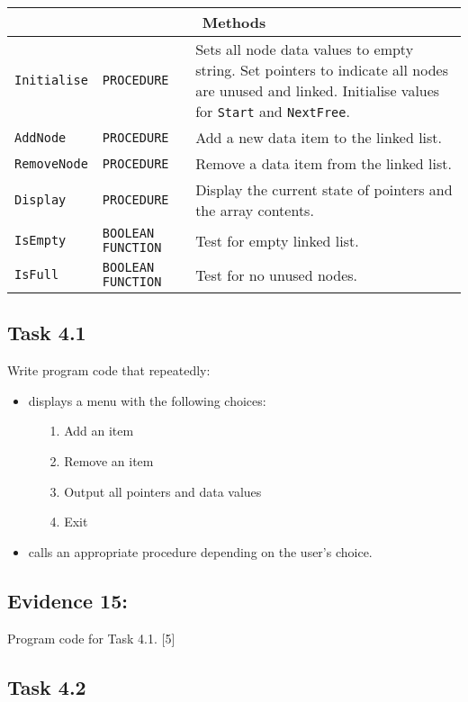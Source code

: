 \begin{center}
\begin{tabular}{|l|l|l|}
\hline 
\multicolumn{3}{|c|}{Methods}\tabularnewline
\hline 
\texttt{Initialise} & \texttt{PROCEDURE} & Sets all node data values to empty string. Set pointers to indicate
all nodes are unused and linked. Initialise values for \texttt{Start}
and \texttt{NextFree}.\tabularnewline
\hline 
\texttt{AddNode} & \texttt{PROCEDURE} & Add a new data item to the linked list. \tabularnewline
\hline 
\texttt{RemoveNode} & \texttt{PROCEDURE} & Remove a data item from the linked list.\tabularnewline
\hline 
\texttt{Display} & \texttt{PROCEDURE} & Display the current state of pointers and the array contents.\tabularnewline
\hline 
\texttt{IsEmpty} & \texttt{BOOLEAN FUNCTION} & Test for empty linked list. \tabularnewline
\hline 
\texttt{IsFull} & \texttt{BOOLEAN FUNCTION} & Test for no unused nodes.\tabularnewline
\hline 
\end{tabular}
\par\end{center}

\subsection*{Task 4.1 }

Write program code that repeatedly: 
\begin{itemize}
\item displays a menu with the following choices: 
\begin{enumerate}
\item[1.]  Add an item
\item[2.]  Remove an item 
\item[3.]  Output all pointers and data values 
\item[4.]  Exit 
\end{enumerate}
\item calls an appropriate procedure depending on the user\textquoteright s
choice. 
\end{itemize}

\subsection*{Evidence 15: }

Program code for Task 4.1. \hfill{}{[}5{]}

\subsection*{Task 4.2 }


